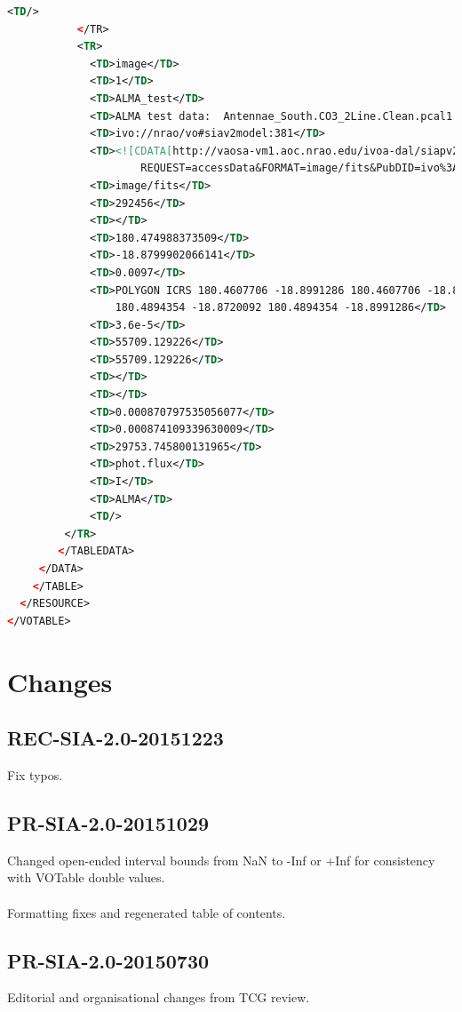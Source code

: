 \documentclass[11pt,a4paper]{ivoa}
\begin{document}
\begin{lstlisting}[basicstyle=\scriptsize,language=XML]
             <TD/> 
           </TR> 
           <TR>
             <TD>image</TD> 
             <TD>1</TD> 
             <TD>ALMA_test</TD> 
             <TD>ALMA test data:  Antennae_South.CO3_2Line.Clean.pcal1.image.mom.weighted_dispersion_coord.fits</TD>  
             <TD>ivo://nrao/vo#siav2model:381</TD> 
             <TD><![CDATA[http://vaosa-vm1.aoc.nrao.edu/ivoa-dal/siapv2-vao/sync?
                     REQUEST=accessData&FORMAT=image/fits&PubDID=ivo%3A%2F%2Fnrao%2Fvo%23image-ByCXy3]]></TD> 
             <TD>image/fits</TD> 
             <TD>292456</TD> 
             <TD></TD> 
             <TD>180.474988373509</TD> 
             <TD>-18.8799902066141</TD> 
             <TD>0.0097</TD> 
             <TD>POLYGON ICRS 180.4607706 -18.8991286 180.4607706 -18.8720092
                 180.4894354 -18.8720092 180.4894354 -18.8991286</TD> 
             <TD>3.6e-5</TD> 
             <TD>55709.129226</TD> 
             <TD>55709.129226</TD> 
             <TD></TD> 
             <TD></TD> 
             <TD>0.000870797535056077</TD> 
             <TD>0.000874109339630009</TD> 
             <TD>29753.745800131965</TD> 
             <TD>phot.flux</TD> 
             <TD>I</TD> 
             <TD>ALMA</TD> 
             <TD/> 
         </TR> 
        </TABLEDATA> 
     </DATA> 
    </TABLE> 
  </RESOURCE> 
</VOTABLE>
\end{lstlisting}
\appendix
\section{Changes}
\subsection{REC-SIA-2.0-20151223}
Fix typos.
\subsection{PR-SIA-2.0-20151029}
Changed open-ended interval bounds from NaN to -Inf or +Inf for consistency with VOTable double values. \\ \\
Formatting fixes and regenerated table of contents.
\subsection{PR-SIA-2.0-20150730}
Editorial and organisational changes from TCG review.
\end{document}
